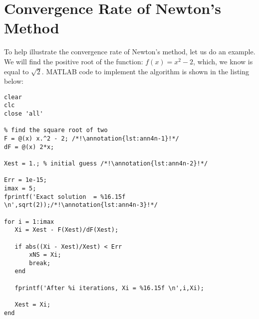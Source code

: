 \section{Convergence Rate of Newton's Method}
To help illustrate the convergence rate of Newton's method, let us do an example.  We will find the positive root of the function: $f(x) = x^2 - 2$, which, we know is equal to $\sqrt{2}$.  MATLAB code to implement the algorithm is shown in the listing below:
\begin{lstlisting}[name=lec4n-ex1, style=myMatlab]
clear
clc
close 'all'

% find the square root of two
F = @(x) x.^2 - 2; /*!\annotation{lst:ann4n-1}!*/
dF = @(x) 2*x;

Xest = 1.; % initial guess /*!\annotation{lst:ann4n-2}!*/

Err = 1e-15;
imax = 5;
fprintf('Exact solution  = %16.15f \n',sqrt(2));/*!\annotation{lst:ann4n-3}!*/

for i = 1:imax
   Xi = Xest - F(Xest)/dF(Xest); 
    
   if abs((Xi - Xest)/Xest) < Err
       xNS = Xi;
       break;
   end
   
   fprintf('After %i iterations, Xi = %16.15f \n',i,Xi);
   
   Xest = Xi;      
end
\end{lstlisting}

